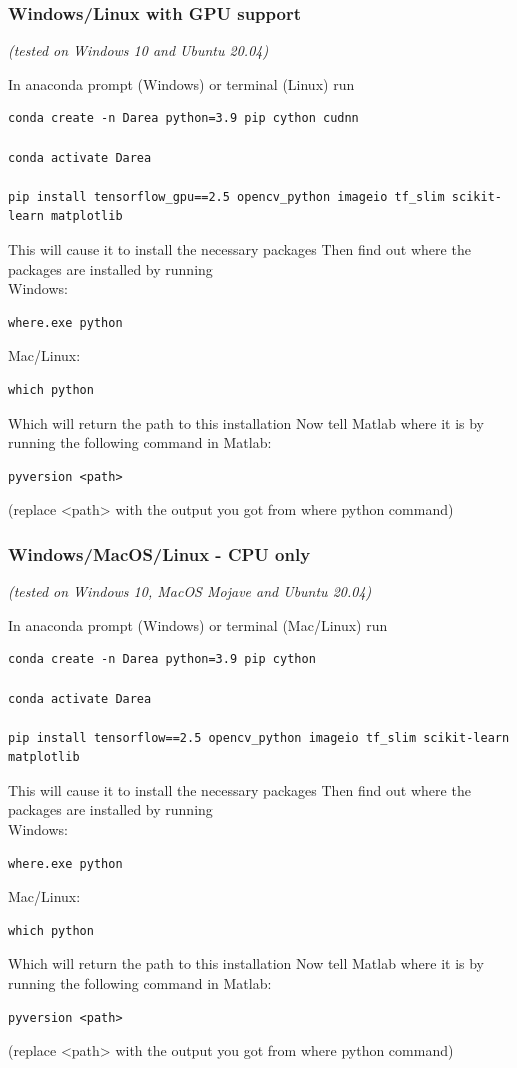 \documentclass[12pt, a4paper]{scrartcl}
\begin{document}
\subsubsection{Windows/Linux with GPU support} 
\textit{(tested on Windows 10 and Ubuntu 20.04)}

In anaconda prompt (Windows) or terminal (Linux) run
\begin{lstlisting}[belowskip=0pt]
conda create -n Darea python=3.9 pip cython cudnn

conda activate Darea

pip install tensorflow_gpu==2.5 opencv_python imageio tf_slim scikit-learn matplotlib
\end{lstlisting}
This will cause it to install the necessary packages
Then find out where the packages are installed by running\\
Windows:
\begin{lstlisting}[belowskip=0pt]
 where.exe python
\end{lstlisting}
Mac/Linux:
\begin{lstlisting}[belowskip=0pt]
 which python
\end{lstlisting}
Which will return the path to this installation
Now tell Matlab where it is by running the following command in Matlab: 
\begin{lstlisting}[belowskip=0pt]
 pyversion <path> 
\end{lstlisting}
(replace <path> with the output you got from where python command)
\subsubsection{Windows/MacOS/Linux - CPU only}
\textit{(tested on Windows 10, MacOS Mojave and Ubuntu 20.04)}

In anaconda prompt (Windows) or terminal (Mac/Linux) run
\begin{lstlisting}[belowskip=0pt]
conda create -n Darea python=3.9 pip cython

conda activate Darea

pip install tensorflow==2.5 opencv_python imageio tf_slim scikit-learn matplotlib
\end{lstlisting}
This will cause it to install the necessary packages
Then find out where the packages are installed by running\\
Windows:
\begin{lstlisting}[belowskip=0pt]
 where.exe python
\end{lstlisting}
Mac/Linux:
\begin{lstlisting}[belowskip=0pt]
 which python
\end{lstlisting}
Which will return the path to this installation
Now tell Matlab where it is by running the following command in Matlab: 
\begin{lstlisting}[belowskip=0pt]
 pyversion <path> 
\end{lstlisting}
(replace <path> with the output you got from where python command)
\end{document}
